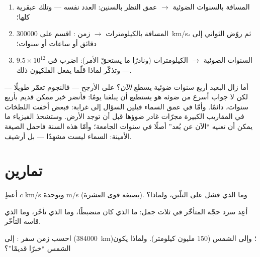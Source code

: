 \begin{method}\label{met:g8:speed-of-light:convert}
\begin{enumerate}
  \item المسافة بالسنوات الضوئية $\to$ عمق النظر بالسنين:
        العدد نفسه --- وتلك عبقرية  كلها؛
  \item المسافة بالكيلومترات $\to$ زمن : اقسم على
        \qty{300000}{km/s}، ثم روّض الثواني إلى دقائق أو
        ساعات أو سنوات؛
  \item السنوات الضوئية $\to$ الكيلومترات (ونادرًا ما يستحقّ
        الأمر): اضرب في $9.5 \times 10^{12}$ --- وتذكّر لماذا
        قلّما يفعل الفلكيون ذلك.
\end{enumerate}
\end{method}

\begin{remark}\label{rem:g8:speed-of-light:now}
أما زال  البعيد أربع سنوات ضوئية يسطع \emph{الآن}؟ على
الأرجح --- فالنجوم تعمّر طويلًا --- لكن لا جواب أسرع من ضوئه
هو يستطيع أن يبلغنا يومًا: فأنضر خبر ممكن قديم بأربع سنوات،
دائمًا. وأمّا في عمق السماء فيلين السؤال إلى غرابة: فبعض أخفت
اللطخات في المقاريب الكبيرة مجرّات غادر ضوؤها قبل أن توجد
الأرض. وستشحذ الفيزياء ما يمكن أن تعنيه ``الآن عن بُعد'' أصلًا
في سنوات الجامعة؛ وأمّا هذه السنة فاحمل الصيغة الأمينة:
السماء ليست مشهدًا --- بل أرشيف.
\end{remark}

\section{تمارين}

\begin{exercise}[$\star$]\label{exo:g8:speed-of-light:1}
أعطِ $c$  \unit{km/s} وبوحدة \unit{m/s} (بصيغة قوى
العشرة). وما الذي فشل على التلّين، ولماذا؟
\end{exercise}

\begin{exercise}[$\star$]\label{exo:g8:speed-of-light:2}
أعِد سرد حجّة  المتأخّر في ثلاث جمل: ما الذي كان منضبطًا،
وما الذي تأخّر، وما الذي قاسه التأخّر.
\end{exercise}

\begin{exercise}[$\star$]\label{exo:g8:speed-of-light:3}
احسب زمن سفر : إلى  (\qty{384000}{km})؛ وإلى الشمس
($150$ مليون كيلومتر). ولماذا يكون  الشمس ``خبرًا
قديمًا''؟
\end{exercise}

